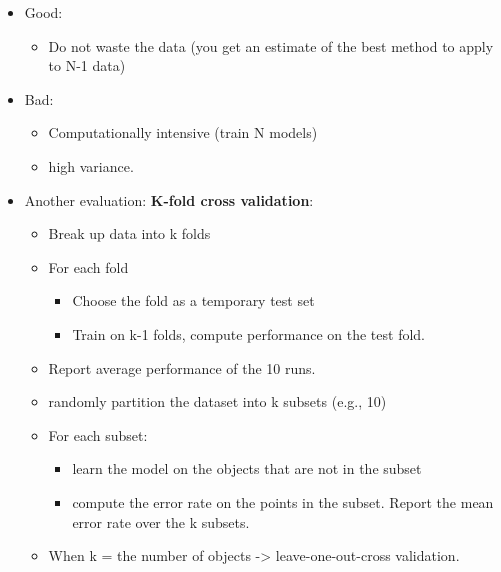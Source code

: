 \documentclass[
]{book}
\providecommand{\tightlist}{%
  \setlength{\itemsep}{0pt}\setlength{\parskip}{0pt}}
\begin{document}
\begin{itemize}
  \begin{itemize}
  \item
    For k = 1 to N

    \begin{itemize}
    \tightlist
    \item
      remove the k-th object from the learning sample
    \item
      learn the model on the remaining objects
    \item
      apply the model to get a prediction for the k-th object
    \end{itemize}
  \item
    report the proportion of mis-classified objects\\
  \end{itemize}
\item
  Good:

  \begin{itemize}
  \tightlist
  \item
    Do not waste the data (you get an estimate of the best method to apply to N-1 data)
  \end{itemize}
\item
  Bad:

  \begin{itemize}
  \tightlist
  \item
    Computationally intensive (train N models)
  \item
    high variance.
  \end{itemize}
\item
  Another evaluation: \textbf{K-fold cross validation}:

  \begin{itemize}
  \item
    Break up data into k folds
  \item
    For each fold

    \begin{itemize}
    \tightlist
    \item
      Choose the fold as a temporary test set
    \item
      Train on k-1 folds, compute performance on the test fold.
    \end{itemize}
  \item
    Report average performance of the 10 runs.
  \item
    randomly partition the dataset into k subsets (e.g., 10)
  \item
    For each subset:

    \begin{itemize}
    \tightlist
    \item
      learn the model on the objects that are not in the subset
    \item
      compute the error rate on the points in the subset. Report the mean error rate over the k subsets.
    \end{itemize}
  \item
    When k = the number of objects -\textgreater{} leave-one-out-cross validation.
  \end{itemize}
\end{itemize}
\end{document}
